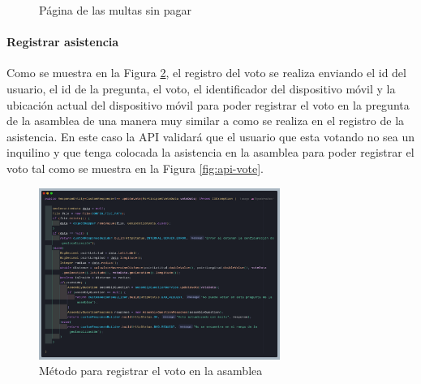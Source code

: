\begin{figure}[H]
    \centering
    \caption{Página de las multas sin pagar}
    \label{fig:app-asistencia}
\end{figure}

\paragraph{Registrar asistencia}

Como se muestra en la Figura \ref{fig:api-votacion-codigo}, el registro del voto se realiza enviando el id del usuario, el id de la pregunta, el voto, el identificador del dispositivo móvil y la ubicación actual del dispositivo móvil para poder registrar el voto en la pregunta de la asamblea de una manera muy similar a como se realiza en el registro de la asistencia.
En este caso la API validará que el usuario que esta votando no sea un inquilino y que tenga colocada la asistencia en la asamblea para poder registrar el voto tal como se muestra en la Figura \ref{fig:api-vote}.

\begin{figure}[H]
    \centering
    \includegraphics[width=0.7\textwidth]{resources/images/api-votacion-metodo}
    \caption{Método para registrar el voto en la asamblea}
    \label{fig:api-votacion-codigo}
\end{figure}

